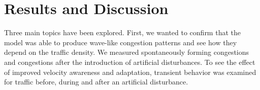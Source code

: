 \documentclass[11pt,a4paper,twocolumn]{article}
\begin{document}
\section{Results and Discussion}\label{sec:results}
Three main topics have been explored. First, we wanted to confirm that the model was able to produce wave-like congestion patterns and see how they depend on the traffic density. We measured spontaneously forming congestions and congestions after the introduction of artificial disturbances. To see the effect of improved velocity awareness and adaptation, transient behavior was examined for traffic before, during and after an artificial disturbance.




\end{document}
